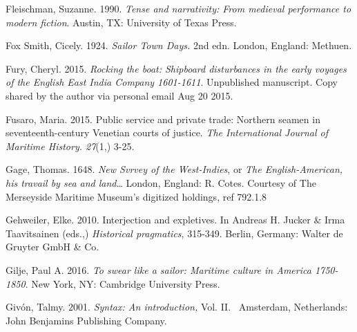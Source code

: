 \begin{styleStandard}
Fleischman, Suzanne. 1990. \textit{Tense and narrativity: From medieval performance to modern fiction}. Austin, TX: University of Texas Press. 
\end{styleStandard}


\begin{styleStandard}
Fox Smith, Cicely. 1924. \textit{Sailor Town Days. }2nd edn.\textit{ }London, England: Methuen. 
\end{styleStandard}


\begin{styleStandard}
Fury, Cheryl. 2015. \textit{Rocking the boat: Shipboard disturbances in the early voyages of the English East India Company 1601-1611}. Unpublished manuscript. Copy shared by the author via personal email Aug 20 2015.
\end{styleStandard}


\begin{styleStandard}
Fusaro, Maria. 2015. Public service and private trade: Northern seamen in seventeenth-century Venetian courts of justice. \textit{The International Journal of Maritime History. 27}(1,) 3-25.
\end{styleStandard}


\begin{styleStandard}
Gage, Thomas. 1648. \textit{New Svrvey of the West-Indies}, or \textit{The English-American, his travail by sea and land}… London, England: R. Cotes. Courtesy of The Merseyside Maritime Museum’s digitized holdings, ref 792.1.8 
\end{styleStandard}


\begin{styleStandard}
Gehweiler, Elke. 2010. Interjection and expletives. In Andreas H. Jucker \& Irma Taavitsainen (eds.,) \textit{Historical pragmatics}, 315-349. Berlin, Germany: Walter de Gruyter GmbH \& Co.
\end{styleStandard}


\begin{styleStandard}
Gilje, Paul A. 2016. \textit{To swear like a sailor: Maritime culture in America 1750-1850}. New York, NY: Cambridge University Press.
\end{styleStandard}


\begin{styleStandard}
Givón, Talmy. 2001. \textit{Syntax: An introduction,} Vol. II. \ Amsterdam, Netherlands: John Benjamins Publishing Company.
\end{styleStandard}


